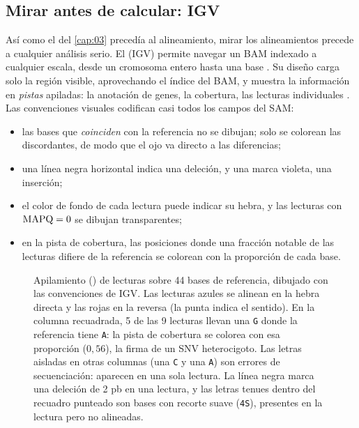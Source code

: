 \subsection{Mirar antes de calcular: IGV}

Así como el  del \cref{cap:03} precedía al alineamiento, mirar los alineamientos precede a cualquier análisis serio. El  (IGV) permite navegar un BAM indexado a cualquier escala, desde un cromosoma entero hasta una base \parencite{c07-robinson2011}. Su diseño carga solo la región visible, aprovechando el índice del BAM, y muestra la información en \emph{pistas} apiladas: la anotación de genes, la cobertura, las lecturas individuales \parencite{c07-thorvaldsdottir2013}. Las convenciones visuales codifican casi todos los campos del SAM:
\begin{itemize}
  \item las bases que \emph{coinciden} con la referencia no se dibujan; solo se colorean las discordantes, de modo que el ojo va directo a las diferencias;
  \item una línea negra horizontal indica una deleción, y una marca violeta, una inserción;
  \item el color de fondo de cada lectura puede indicar su hebra, y las lecturas con $\operatorname{MAPQ}=0$ se dibujan transparentes;
  \item en la pista de cobertura, las posiciones donde una fracción notable de las lecturas difiere de la referencia se colorean con la proporción de cada base.
\end{itemize}

\begin{figure}[tbp]
\centering

\caption[Pileup de lecturas al estilo IGV]{Apilamiento () de lecturas sobre 44 bases de referencia, dibujado con las convenciones de IGV. Las lecturas azules se alinean en la hebra directa y las rojas en la reversa (la punta indica el sentido). En la columna recuadrada, 5 de las 9 lecturas llevan una \texttt{G} donde la referencia tiene \texttt{A}: la pista de cobertura se colorea con esa proporción ($0{,}56$), la firma de un SNV heterocigoto. Las letras aisladas en otras columnas (una \texttt{C} y una \texttt{A}) son errores de secuenciación: aparecen en una sola lectura. La línea negra marca una deleción de 2 pb en una lectura, y las letras tenues dentro del recuadro punteado son bases con recorte suave (\texttt{4S}), presentes en la lectura pero no alineadas.}
\label{fig:07-pileup}
\end{figure}

